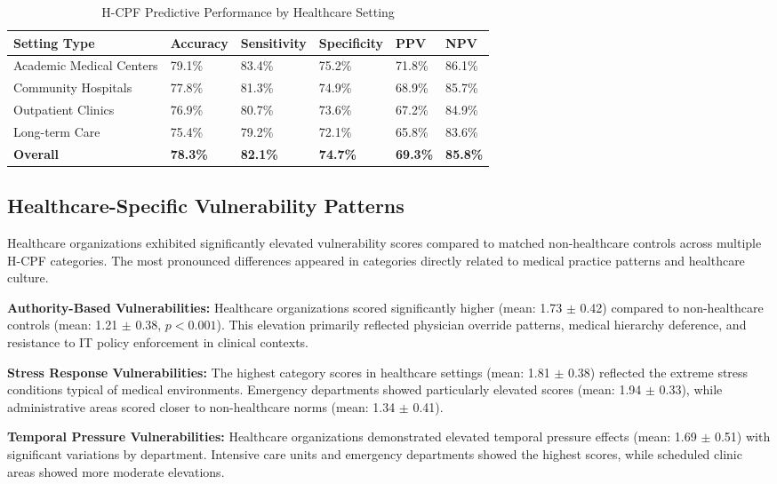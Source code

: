\documentclass[10pt, twocolumn]{article}
\begin{document}
\begin{table*}[t]
\caption{H-CPF Predictive Performance by Healthcare Setting}
\label{tab:predictive_performance}
\centering
\begin{tabular}{@{}l l l l l l@{}}
\toprule
\textbf{Setting Type} & \textbf{Accuracy} & \textbf{Sensitivity} & \textbf{Specificity} & \textbf{PPV} & \textbf{NPV} \\
\midrule
Academic Medical Centers & 79.1\% & 83.4\% & 75.2\% & 71.8\% & 86.1\% \\
Community Hospitals & 77.8\% & 81.3\% & 74.9\% & 68.9\% & 85.7\% \\
Outpatient Clinics & 76.9\% & 80.7\% & 73.6\% & 67.2\% & 84.9\% \\
Long-term Care & 75.4\% & 79.2\% & 72.1\% & 65.8\% & 83.6\% \\
\midrule
\textbf{Overall} & \textbf{78.3\%} & \textbf{82.1\%} & \textbf{74.7\%} & \textbf{69.3\%} & \textbf{85.8\%} \\
\bottomrule
\end{tabular}
\end{table*}

\subsection{Healthcare-Specific Vulnerability Patterns}

Healthcare organizations exhibited significantly elevated vulnerability scores compared to matched non-healthcare controls across multiple H-CPF categories. The most pronounced differences appeared in categories directly related to medical practice patterns and healthcare culture.

\textbf{Authority-Based Vulnerabilities:} Healthcare organizations scored significantly higher (mean: 1.73 $\pm$ 0.42) compared to non-healthcare controls (mean: 1.21 $\pm$ 0.38, $p < 0.001$). This elevation primarily reflected physician override patterns, medical hierarchy deference, and resistance to IT policy enforcement in clinical contexts.

\textbf{Stress Response Vulnerabilities:} The highest category scores in healthcare settings (mean: 1.81 $\pm$ 0.38) reflected the extreme stress conditions typical of medical environments. Emergency departments showed particularly elevated scores (mean: 1.94 $\pm$ 0.33), while administrative areas scored closer to non-healthcare norms (mean: 1.34 $\pm$ 0.41).

\textbf{Temporal Pressure Vulnerabilities:} Healthcare organizations demonstrated elevated temporal pressure effects (mean: 1.69 $\pm$ 0.51) with significant variations by department. Intensive care units and emergency departments showed the highest scores, while scheduled clinic areas showed more moderate elevations.
\end{document}

